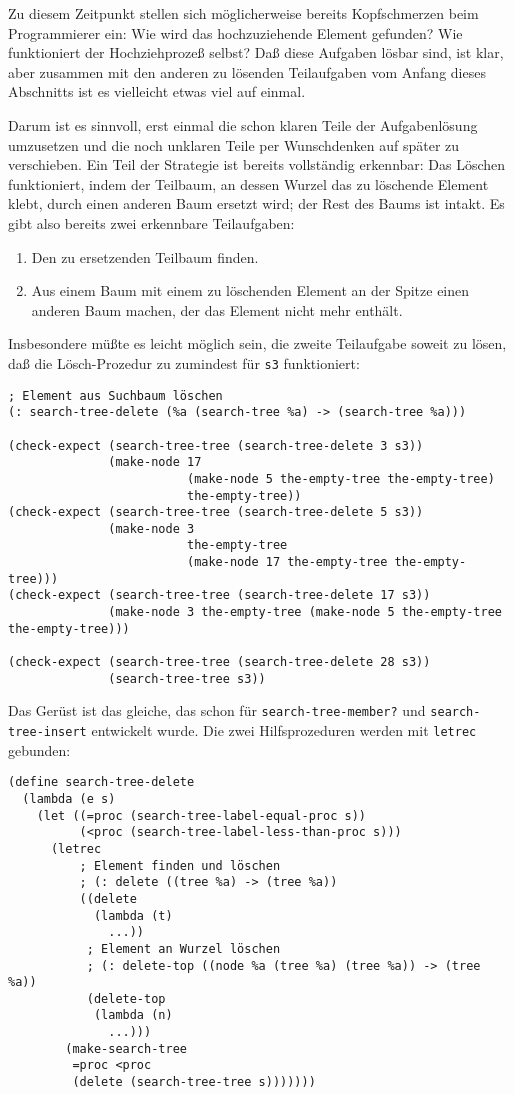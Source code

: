 Zu diesem Zeitpunkt stellen sich möglicherweise bereits Kopfschmerzen
beim Programmierer ein: Wie wird das hochzuziehende Element gefunden?
Wie funktioniert der Hochziehprozeß selbst?  Daß diese Aufgaben lösbar
sind, ist klar, aber zusammen mit den anderen zu lösenden Teilaufgaben
vom Anfang dieses Abschnitts ist es vielleicht etwas viel auf einmal.

Darum ist es sinnvoll, erst einmal die schon klaren Teile der
Aufgabenlösung umzusetzen und die noch unklaren Teile per Wunschdenken
auf später zu verschieben.  Ein Teil der Strategie ist bereits
vollständig erkennbar: Das Löschen funktioniert, indem der Teilbaum,
an dessen Wurzel das zu löschende Element klebt, durch einen anderen
Baum ersetzt wird; der Rest des Baums ist intakt.  Es gibt also
bereits zwei erkennbare Teilaufgaben:
%
\begin{enumerate}
\item Den zu ersetzenden Teilbaum finden.
\item Aus einem Baum mit einem zu löschenden Element an der Spitze
  einen anderen Baum machen, der das Element nicht mehr enthält.
\end{enumerate}
%
Insbesondere müßte es leicht möglich sein, die zweite Teilaufgabe
soweit zu lösen, daß die Lösch-Prozedur zu zumindest für \texttt{s3}
funktioniert:
%
\begin{verbatim}
; Element aus Suchbaum löschen
(: search-tree-delete (%a (search-tree %a) -> (search-tree %a)))

(check-expect (search-tree-tree (search-tree-delete 3 s3))
              (make-node 17
                         (make-node 5 the-empty-tree the-empty-tree)
                         the-empty-tree))
(check-expect (search-tree-tree (search-tree-delete 5 s3))
              (make-node 3
                         the-empty-tree
                         (make-node 17 the-empty-tree the-empty-tree)))
(check-expect (search-tree-tree (search-tree-delete 17 s3))
              (make-node 3 the-empty-tree (make-node 5 the-empty-tree the-empty-tree)))

(check-expect (search-tree-tree (search-tree-delete 28 s3))
              (search-tree-tree s3))
\end{verbatim}
%
Das Gerüst ist das gleiche, das schon für \texttt{search-tree-member?}
und \texttt{search-tree-insert} entwickelt wurde.  Die zwei
Hilfsprozeduren werden mit \texttt{letrec} gebunden:
%
\begin{verbatim}
(define search-tree-delete
  (lambda (e s)
    (let ((=proc (search-tree-label-equal-proc s))
          (<proc (search-tree-label-less-than-proc s)))
      (letrec
          ; Element finden und löschen
          ; (: delete ((tree %a) -> (tree %a))
          ((delete
            (lambda (t)
              ...))
           ; Element an Wurzel löschen
           ; (: delete-top ((node %a (tree %a) (tree %a)) -> (tree %a))
           (delete-top
            (lambda (n)
              ...)))
        (make-search-tree
         =proc <proc
         (delete (search-tree-tree s)))))))
\end{verbatim}
